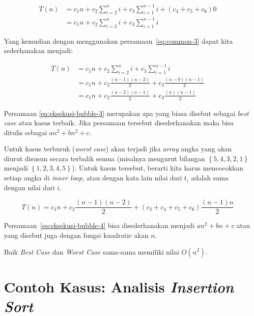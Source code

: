 \begin{equation}\label{eq:eksekusi-bubble-2}
    \begin{aligned}
        T(n) & = c_{1}n + c_{2}\sum\limits_{i=2}^n i + c_{3}\sum\limits_{i=1}^{n-1} i + (c_{4}+c_{5}+c_{6}) 0 \\
             & =  c_{1}n + c_{2}\sum\limits_{i=2}^n i + c_{3}\sum\limits_{i=1}^{n-1} i
    \end{aligned}
\end{equation}

Yang kemudian dengan menggunakan persamaan~\ref{eq:common-3} dapat kita sederhanakan menjadi:

\begin{equation}\label{eq:eksekusi-bubble-3}
    \begin{aligned}
        T(n) & =  c_{1}n + c_{2}\sum\limits_{i=2}^n i + c_{3}\sum\limits_{i=1}^{n-1} i \\
             & = c_{1}n + c_2 \frac{(n-1)(n-2)}{2} + c_3 \frac{(n - 0)(n - 1)}{2} \\
             & = c_{1}n + c_2 \frac{(n-2)(n-1)}{2} + c_3 \frac{(n)(n - 1)}{2}
    \end{aligned}
\end{equation}

Persamaan \ref{eq:eksekusi-bubble-3} merupakan apa yang biasa disebut sebagai \textit{best case} atau kasus terbaik. Jika persamaan tersebut disederhanakan maka bisa ditulis sebagai $an^2+bn^2+c$. 

Untuk kasus terburuk (\textit{worst case}) akan terjadi jika \textit{array} angka yang akan diurut disusun secara terbalik semua (misalnya mengurut bilangan $\left\{5,4,3,2,1\right\}$ menjadi $\left\{1,2,3,4,5\right\}$). Untuk kasus tersebut, berarti kita harus mencocokkan setiap angka di \textit{inner loop}, atau dengan kata lain nilai dari $t_{i}$ adalah sama dengan nilai dari $i$. 

\begin{equation}\label{eq:eksekusi-bubble-4}
    T(n) = c_{1}n + c_2\frac{(n-1)(n-2)}{2} + (c_3+c_4+c_5+c_6)\frac{(n-1)n}{2}
\end{equation}

Persamaan~\ref{eq:eksekusi-bubble-4} bisa disederhanakan menjadi $an^2+bn+c$ atau yang disebut juga dengan fungsi kuadratic akan $n$. 

Baik \textit{Best Case} dan \textit{Worst Case} sama-sama memiliki nilai $O(n^2)$.

\section{Contoh Kasus: Analisis \textit{Insertion Sort}}

